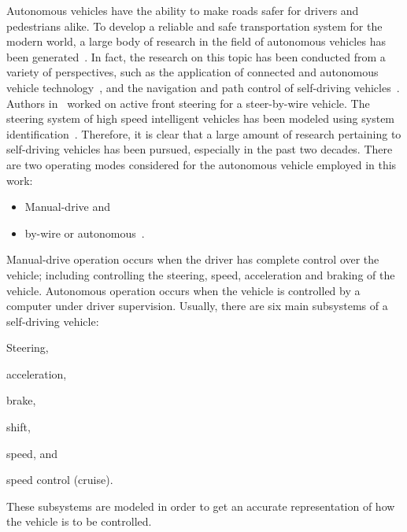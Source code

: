 \documentclass[conference]{IEEEtran}
\begin{document}
Autonomous vehicles have the ability to make roads safer for drivers
and pedestrians alike. To develop a reliable and safe transportation system for the 
modern world, a large body of research in the field of autonomous vehicles has
been generated~\cite{Liu2017,Prasad2020}. In fact, the research on this topic has been conducted from a variety of perspectives, such as the application of connected and autonomous vehicle technology~\cite{DoT2017}, and the navigation and path control of self-driving vehicles~\cite{Duong2018,Chajan2021}. Authors in~\cite{Saruchi2015} worked on active front steering for a steer-by-wire vehicle. The steering system of high speed intelligent vehicles has been modeled using system identification~\cite{Li1999}. Therefore, it is clear that a large amount of research pertaining to self-driving vehicles has been pursued, especially in the past two decades. There are two operating modes considered for the autonomous vehicle employed in this work: %
%
\begin{itemize}
  \item Manual-drive and
  \item by-wire or autonomous~\cite{Saruchi2015}.
\end{itemize}
%
Manual-drive operation occurs when the driver has complete control over the vehicle; including controlling the steering, speed, acceleration and braking of the vehicle. Autonomous operation occurs when the vehicle is controlled by a computer under driver supervision.
%
Usually, there are six main subsystems of a self-driving vehicle: %
%
\begin{enumerate*}
\item  Steering,

\item acceleration,

\item brake,

\item shift,

\item speed, and

\item speed control (cruise).
\end{enumerate*}
%
These subsystems are modeled in order to get an accurate representation of how
the vehicle is to be controlled. %
\end{document}
